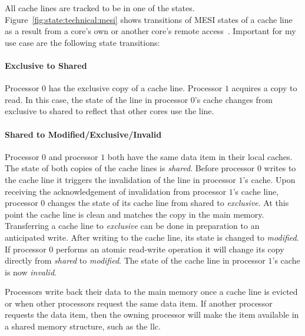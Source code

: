 All cache lines are tracked to be in one of the states.
Figure~\ref{fig:state:technical:mesi} shows transitions of MESI states of a
cache line as a result from a core's own or another core's remote
access~\cite{mckenney2010memory}. Important for my use case are the following
state transitions:

\paragraph{Exclusive to Shared}
Processor $0$ has the exclusive copy of a cache line. Processor $1$ acquires a
copy to read. In this case, the state of the line in processor $0$'s
cache changes from exclusive to shared to reflect that other cores use the line.

\paragraph{Shared to Modified/Exclusive/Invalid}
Processor $0$ and processor $1$ both have the same data item in their local
caches. The state of both copies of the cache lines is \textit{shared}. Before
processor $0$ writes to the cache line it triggers the invalidation of the line
in processor $1$'s cache. Upon receiving the acknowledgement of invalidation
from processor $1$'s cache line, processor $0$ changes the state of its cache
line from shared to \textit{exclusive}. At this point the cache line is clean
and matches the copy in the main memory. Transferring a cache line to
\textit{exclusive} can be done in preparation to an anticipated write. After
writing to the cache line, its state is changed to \textit{modified}. If
processor $0$ performs an atomic read-write operation it will change its copy
directly from \textit{shared} to \textit{modified}. The state of the cache line
in processor $1$'s cache is now \textit{invalid}.

Processors write back their data to the main memory once a cache line is evicted
or when other processors request the same data item. If another processor
requests the data item, then the owning processor will make the item available
in a shared memory structure, such as the \gls{llc}.

